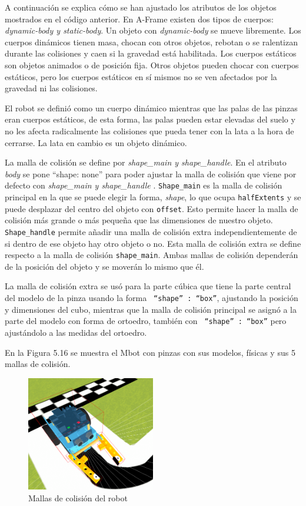 A continuación se explica cómo se han ajustado los atributos de los objetos mostrados en el código anterior. En A-Frame existen dos tipos de cuerpos: \textit{dynamic-body y static-body}. Un objeto con \textit{dynamic-body}  se mueve libremente. Los cuerpos dinámicos tienen masa, chocan con otros objetos, rebotan o se ralentizan durante las colisiones y caen si la gravedad está habilitada.
Los cuerpos estáticos son objetos animados o de posición fija. Otros objetos pueden chocar con cuerpos estáticos, pero los cuerpos estáticos en sí mismos no se ven afectados por la gravedad ni las colisiones.

El robot se definió como un cuerpo dinámico mientras que las palas de las pinzas eran cuerpos estáticos, de esta forma, las palas pueden estar elevadas del suelo y no les afecta  radicalmente las colisiones que pueda tener con la lata a la hora de cerrarse. La lata en cambio es un objeto dinámico.

La malla de colisión se define por \textit{shape\_main y shape\_handle}. En el atributo \textit{body} se pone ``shape: none'' para poder ajustar la malla de colisión que viene por defecto con \textit{shape\_main y shape\_handle} .
\texttt{Shape\_main} es la malla de colisión principal en la que se puede elegir la forma, \textit{shape}, lo que ocupa \texttt{halfExtents} y se puede desplazar del centro del objeto con \texttt{offset}. Esto permite hacer la malla de colisión más grande o más pequeña que las dimensiones de nuestro objeto. \texttt{ Shape\_handle} permite añadir una malla de colisión extra independientemente de si dentro de ese  objeto hay otro objeto o no. Esta malla de colisión extra se define respecto a la malla de colisión \texttt{shape\_main}. Ambas mallas de colisión dependerán de la posición del objeto y se moverán lo mismo que él.

La malla de colisión extra se usó para la parte cúbica que tiene la parte central del modelo de la pinza usando la forma  \texttt{ ``shape'' : ``box''},  ajustando  la posición y dimensiones del cubo, mientras que la malla de colisión principal se asignó a la parte del modelo con forma de ortoedro, también con \texttt{ ``shape'' : ``box''} pero ajustándolo a las medidas del ortoedro.

En la Figura  5.16 se muestra el Mbot con pinzas con sus modelos, físicas y sus 5 mallas de colisión.

 \begin{figure}[H]
  \centering
 \includegraphics[width=0.5\textwidth, height=0.4\textwidth]{chapters/images/mallas.png}
  \caption{Mallas de colisión del robot}
\end{figure}

